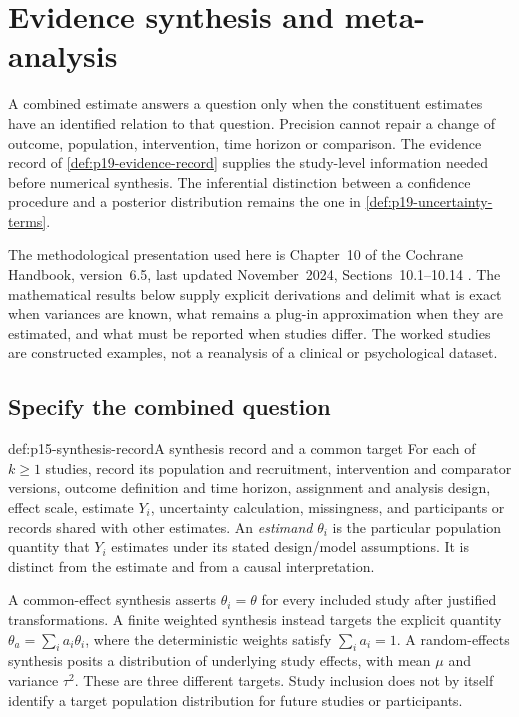 \chapter{Evidence synthesis and meta-analysis}
\label{sec:p15-evidence-synthesis}

A combined estimate answers a question only when the constituent estimates
have an identified relation to that question. Precision cannot repair a
change of outcome, population, intervention, time horizon or comparison.
The evidence record of \ref{def:p19-evidence-record} supplies the study-level
information needed before numerical synthesis. The inferential distinction
between a confidence procedure and a posterior distribution remains the
one in \ref{def:p19-uncertainty-terms}.

The methodological presentation used here is Chapter~10 of the Cochrane
Handbook, version~6.5, last updated November~2024, Sections~10.1--10.14
\cite{DeeksEtAl2024Cochrane10}. The mathematical results below supply explicit
derivations and delimit what is exact when variances are known, what remains
a plug-in approximation when they are estimated, and what must be reported
when studies differ. The worked studies are constructed examples, not a
reanalysis of a clinical or psychological dataset.

\section{Specify the combined question}
\label{sec:p15-synthesis-compatibility}

\begin{hbdefinition}{def:p15-synthesis-record}{A synthesis record and a common target}
For each of \(k\geq1\) studies, record its population and recruitment,
intervention and comparator versions, outcome definition and time horizon,
assignment and analysis design, effect scale, estimate \(Y_i\), uncertainty
calculation, missingness, and participants or records shared with other
estimates. An \emph{estimand} \(\theta_i\) is the particular population
quantity that \(Y_i\) estimates under its stated design/model assumptions.
It is distinct from the estimate and from a causal interpretation.

A common-effect synthesis asserts \(\theta_i=\theta\) for every included
study after justified transformations. A finite weighted synthesis instead
targets the explicit quantity \(\theta_a=\sum_i a_i\theta_i\), where
the deterministic weights satisfy \(\sum_i a_i=1\). A random-effects
synthesis posits a distribution of underlying study effects, with mean
\(\mu\) and variance \(\tau^2\). These are three different targets.
Study inclusion does not by itself identify a target population distribution
for future studies or participants.
\end{hbdefinition}

